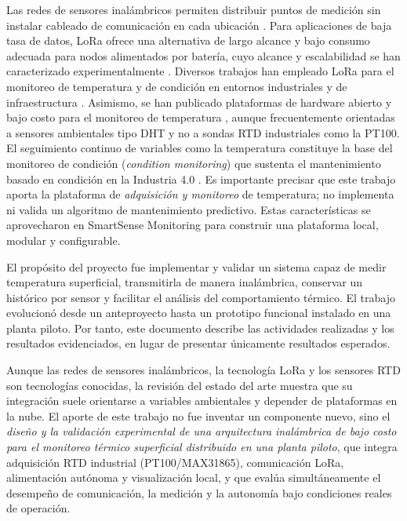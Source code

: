 \documentclass[conference]{IEEEtran}
\begin{document}
Las redes de sensores inalámbricos permiten distribuir puntos de medición sin instalar cableado de comunicación en cada ubicación \cite{akyildiz2002,yick2008,mois2017}. Para aplicaciones de baja tasa de datos, LoRa ofrece una alternativa de largo alcance y bajo consumo adecuada para nodos alimentados por batería, cuyo alcance y escalabilidad se han caracterizado experimentalmente \cite{centenaro2016,semtech2015,augustin2016,bor2016}. Diversos trabajos han empleado LoRa para el monitoreo de temperatura y de condición en entornos industriales y de infraestructura \cite{polonelli2019,jakobsen2024}. Asimismo, se han publicado plataformas de hardware abierto y bajo costo para el monitoreo de temperatura \cite{higroterm2021,jakobsen2024}, aunque frecuentemente orientadas a sensores ambientales tipo DHT y no a sondas RTD industriales como la PT100. El seguimiento continuo de variables como la temperatura constituye la base del monitoreo de condición (\textit{condition monitoring}) que sustenta el mantenimiento basado en condición en la Industria 4.0 \cite{cinar2020,jardine2006}. Es importante precisar que este trabajo aporta la plataforma de \emph{adquisición y monitoreo} de temperatura; no implementa ni valida un algoritmo de mantenimiento predictivo. Estas características se aprovecharon en SmartSense Monitoring para construir una plataforma local, modular y configurable.

El propósito del proyecto fue implementar y validar un sistema capaz de medir temperatura superficial, transmitirla de manera inalámbrica, conservar un histórico por sensor y facilitar el análisis del comportamiento térmico. El trabajo evolucionó desde un anteproyecto hasta un prototipo funcional instalado en una planta piloto. Por tanto, este documento describe las actividades realizadas y los resultados evidenciados, en lugar de presentar únicamente resultados esperados.

Aunque las redes de sensores inalámbricos, la tecnología LoRa y los sensores RTD son tecnologías conocidas, la revisión del estado del arte muestra que su integración suele orientarse a variables ambientales y depender de plataformas en la nube. El aporte de este trabajo no fue inventar un componente nuevo, sino el \emph{diseño y la validación experimental de una arquitectura inalámbrica de bajo costo para el monitoreo térmico superficial distribuido en una planta piloto}, que integra adquisición RTD industrial (PT100/MAX31865), comunicación LoRa, alimentación autónoma y visualización local, y que evalúa simultáneamente el desempeño de comunicación, la medición y la autonomía bajo condiciones reales de operación.
\end{document}
